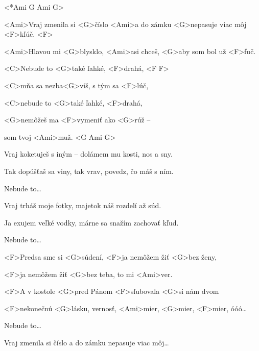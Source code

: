 

<*Ami G Ami G>

\zs
<Ami>Vraj zmenila si <G>číslo <Ami>a do zámku <G>nepasuje viac môj <F>kľúč. <F>

<Ami>Hlavou mi <G>blysklo, <Ami>asi chceš, <G>aby som bol už <F>fuč.
\ks

\zr
<C>Nebude to <G>také ľahké, <F>drahá, <F F>

<C>mňa sa nezba<G>víš, s tým sa <F>lúč,

<C>nebude to <G>také ľahké, <F>drahá,

<G>nemôžeš ma <F>vymeniť ako <G>rúž –

som tvoj <Ami>muž. <G Ami G>
\kr

\zs
Vraj koketuješ s iným – dolámem mu kosti, nos a sny.

Tak dopúšťaš sa viny, tak vrav, povedz, čo máš s ním.
\ks

\zr
Nebude to…
\kr

\zs
Vraj trháš moje fotky, majetok náš rozdelí až súd.

Ja exujem veľké vodky, márne sa snažím zachovať kľud.
\ks

\zr
Nebude to…
\kr

\zs
<F>Predsa sme si <G>súdení, <F>ja nemôžem žiť <G>bez ženy,

<F>ja nemôžem žiť <G>bez teba, to mi <Ami>ver.

<F>A v kostole <G>pred Pánom <F>sľubovala <G>si nám dvom

<F>nekonečnú <G>lásku, vernosť, <Ami>mier, <G>mier, <F>mier, óóó…
\ks

\zr
Nebude to…
\kr

\zs
Vraj zmenila si číslo a do zámku nepasuje viac môj…
\ks

\kp
